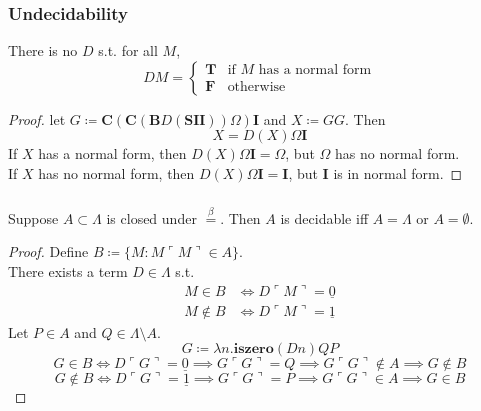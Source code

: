 \documentclass[UTF8,aspectratio=43,11pt,colorlinks,compress,openany]{beamer}%
\begin{document}
\begin{frame}\frametitle{Undecidability}
	\begin{theorem}[Church1936]
		There is no $D$ s.t. for all $M$,
	\setlength\abovedisplayskip{0pt}
	\setlength\belowdisplayskip{0pt}
		\[DM=
		\begin{cases}
		\mathbf{T}&\text{if $M$ has a normal form}\\
		\mathbf{F}&\text{otherwise}
		\end{cases}\]
	\end{theorem}
	\begin{proof}
		let $G\coloneqq \mathbf{C}(\mathbf{C}(\mathbf{B}D(\mathbf{S}\mathbf{I}\mathbf{I}))\Omega)\mathbf{I}$ and $X\coloneqq GG$. Then
		\[X=D(X)\Omega\mathbf{I}\]
		If $X$ has a normal form, then $D(X)\Omega\mathbf{I}=\Omega$, but $\Omega$ has no normal form.\\
		If $X$ has no normal form, then $D(X)\Omega\mathbf{I}=\mathbf{I}$, but $\mathbf{I}$ is in normal form.
	\end{proof}
\end{frame}

\begin{frame}\frametitle{}
	\begin{theorem}
		Suppose $A\subset\Lambda$ is closed under $\stackrel{\beta}{=}$. Then $A$ is decidable iff $A=\Lambda$ or $A=\emptyset$.
	\end{theorem}
	\begin{proof}
		Define $B\coloneqq \{M: M\ulcorner M\urcorner\in A\}$.\\
		There exists a term $D\in\Lambda$ s.t.
		\begin{align*}
		M\in B&\iff D\ulcorner M\urcorner=\underline{0}\\
		M\notin B&\iff D\ulcorner M\urcorner=\underline{1}
		\end{align*}
		Let $P\in A$ and $Q\in\Lambda\setminus A$.
		\[G\coloneqq \lambda n.\mathbf{iszero}(Dn)QP\]
		\[G\in B\iff D\ulcorner G\urcorner=\underline{0}\implies G\ulcorner G\urcorner=Q\implies G\ulcorner G\urcorner\notin A\implies G\notin B\]
		\[G\notin B\iff D\ulcorner G\urcorner=\underline{1}\implies G\ulcorner G\urcorner=P\implies G\ulcorner G\urcorner\in A\implies G\in B\]
	\end{proof}
\end{frame}
\end{document}
